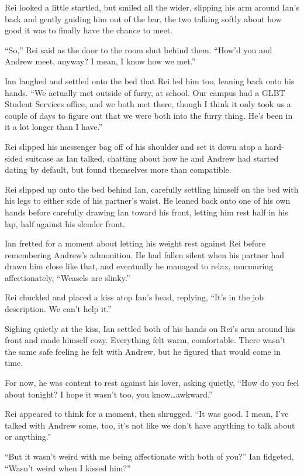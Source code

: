 Rei looked a little startled, but smiled all the wider, slipping his arm around Ian's back and gently guiding him out of the bar, the two talking softly about how good it was to finally have the chance to meet.

``So,'' Rei said as the door to the room shut behind them. ``How'd you and Andrew meet, anyway? I mean, I know how we met.''

Ian laughed and settled onto the bed that Rei led him too, leaning back onto his hands. ``We actually met outside of furry, at school. Our campus had a GLBT Student Services office, and we both met there, though I think it only took us a couple of days to figure out that we were both into the furry thing. He's been in it a lot longer than I have.''

Rei slipped his messenger bag off of his shoulder and set it down atop a hard-sided suitcase as Ian talked, chatting about how he and Andrew had started dating by default, but found themselves more than compatible.

Rei slipped up onto the bed behind Ian, carefully settling himself on the bed with his legs to either side of his partner's waist. He leaned back onto one of his own hands before carefully drawing Ian toward his front, letting him rest half in his lap, half against his slender front.

Ian fretted for a moment about letting his weight rest against Rei before remembering Andrew's admonition. He had fallen silent when his partner had drawn him close like that, and eventually he managed to relax, murmuring affectionately, ``Weasels are slinky.''

Rei chuckled and placed a kiss atop Ian's head, replying, ``It's in the job description. We can't help it.''

Sighing quietly at the kiss, Ian settled both of his hands on Rei's arm around his front and made himself cozy. Everything felt warm, comfortable. There wasn't the same safe feeling he felt with Andrew, but he figured that would come in time.

For now, he was content to rest against his lover, asking quietly, ``How do you feel about tonight? I hope it wasn't too, you know\ldots{}awkward.''

Rei appeared to think for a moment, then shrugged. ``It was good. I mean, I've talked with Andrew some, too, it's not like we don't have anything to talk about or anything.''

``But it wasn't weird with me being affectionate with both of you?'' Ian fidgeted, ``Wasn't weird when I kissed him?''

